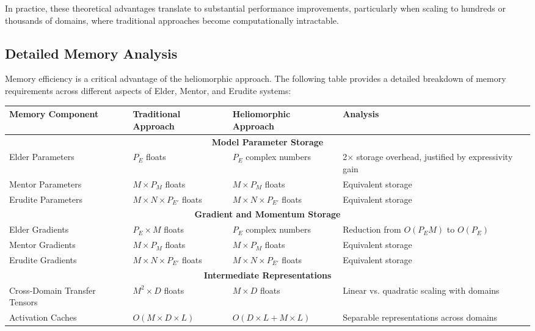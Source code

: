 In practice, these theoretical advantages translate to substantial performance improvements, particularly when scaling to hundreds or thousands of domains, where traditional approaches become computationally intractable.

\subsection{Detailed Memory Analysis}

Memory efficiency is a critical advantage of the heliomorphic approach. The following table provides a detailed breakdown of memory requirements across different aspects of Elder, Mentor, and Erudite systems:

\begin{table}[h]
\centering
\begin{tabular}{|p{3.5cm}|p{3.5cm}|p{3.5cm}|p{3.5cm}|}
\hline
\textbf{Memory Component} & \textbf{Traditional Approach} & \textbf{Heliomorphic Approach} & \textbf{Analysis} \\
\hline
\multicolumn{4}{|c|}{\textbf{Model Parameter Storage}} \\
\hline
Elder Parameters & $P_E$ floats & $P_E$ complex numbers & 2× storage overhead, justified by expressivity gain \\
\hline
Mentor Parameters & $M \times P_M$ floats & $M \times P_M$ floats & Equivalent storage \\
\hline
Erudite Parameters & $M \times N \times P_{E'}$ floats & $M \times N \times P_{E'}$ floats & Equivalent storage \\
\hline
\multicolumn{4}{|c|}{\textbf{Gradient and Momentum Storage}} \\
\hline
Elder Gradients & $P_E \times M$ floats & $P_E$ complex numbers & Reduction from $O(P_E M)$ to $O(P_E)$ \\
\hline
Mentor Gradients & $M \times P_M$ floats & $M \times P_M$ floats & Equivalent storage \\
\hline
Erudite Gradients & $M \times N \times P_{E'}$ floats & $M \times N \times P_{E'}$ floats & Equivalent storage \\
\hline
\multicolumn{4}{|c|}{\textbf{Intermediate Representations}} \\
\hline
Cross-Domain Transfer Tensors & $M^2 \times D$ floats & $M \times D$ floats & Linear vs. quadratic scaling with domains \\
\hline
Activation Caches & $O(M \times D \times L)$ & $O(D \times L + M \times L)$ & Separable representations across domains \\

\end{tabular}
\end{table}
